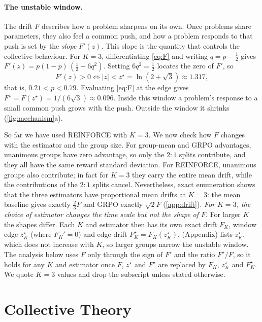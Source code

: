 \paragraph{The unstable window.}
The drift $F$ describes how a problem sharpens on its own. Once problems share parameters, they also feel a common push, and how a problem responds to that push is set by the \emph{slope} $F'(z)$. This slope is the quantity that controls the collective behaviour.
For $K=3$, differentiating \cref{eq:F} and writing $q=p-\tfrac12$ gives $F'(z)=p(1-p)\,(\tfrac12-6q^2)$. Setting $6q^2=\tfrac12$ locates the zero of $F'$, so
\begin{equation}
  F'(z)>0 \iff |z|<z^\star=\ln(2+\sqrt3)\approx1.317,
  \label{eq:window}
\end{equation}
that is, $0.21<p<0.79$. Evaluating \cref{eq:F} at the edge gives $F^\star=F(z^\star)=1/(6\sqrt3)\approx0.096$.
Inside this window a problem's response to a small common push grows with the push. Outside the window it shrinks (\cref{fig:mechanism}a).

So far we have used REINFORCE with $K=3$. We now check how $F$ changes with the estimator and the group size.
For group-mean and GRPO advantages, unanimous groups have zero advantage, so only the $2{:}1$ splits contribute, and they all have the same reward standard deviation. For REINFORCE, unanimous groups also contribute; in fact for $K=3$ they carry the entire mean drift, while the contributions of the $2{:}1$ splits cancel.
Nevertheless, exact enumeration shows that the three estimators have proportional mean drifts at $K=3$: the mean baseline gives exactly $\tfrac23F$ and GRPO exactly $\sqrt2F$ (\cref{app:drift}). \emph{For $K=3$, the choice of estimator changes the time scale but not the shape of $F$}.
For larger $K$ the shapes differ. Each $K$ and estimator then has its own exact drift $F_K$, window edge $z^\star_K$ (where $F_K'=0$) and edge drift $F^\star_K=F_K(z^\star_K)$.
 (Appendix) lists $z^\star_K$, which does not increase with $K$, so larger groups narrow the unstable window.
The analysis below uses $F$ only through the sign of $F'$ and the ratio $F^\star/F$, so it holds for any $K$ and estimator once $F$, $z^\star$ and $F^\star$ are replaced by $F_K$, $z^\star_K$ and $F^\star_K$. We quote $K=3$ values and drop the subscript unless stated otherwise.



\section{Collective Theory}
\label{sec:theory}

